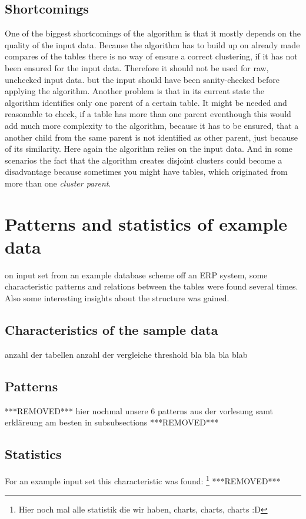 \documentclass[10pt, journal, twocolumn]{IEEEtran}
\begin{document}
\subsection{Shortcomings}
One of the biggest shortcomings of the algorithm is that it mostly depends on the quality of the input data. Because the algorithm has to build up on already made compares of the tables there is no way of ensure a correct clustering, if it has not been ensured for the input data. Therefore it should not be used for raw, unchecked input data. but the input should have been sanity-checked before applying the algorithm. Another problem is that in its current state the algorithm identifies only one parent of a certain table. It might be needed and reasonable to check, if a table has more than one parent eventhough this would add much more complexity to the algorithm, because it has to be ensured, that a another child from the same parent is not identified as other parent, just because of its similarity. Here again the algorithm relies on the input data. And in some scenarios the fact that the algorithm creates disjoint clusters could become a disadvantage because sometimes you might have tables, which originated from more than one \textit{cluster parent}.
\section{Patterns and statistics of example data}
 on input set from an example database scheme off an ERP system, some characteristic patterns and relations between the tables were found several times. Also some interesting insights about the structure was gained.
\subsection{Characteristics of the sample data}
 anzahl der tabellen anzahl der vergleiche threshold bla bla bla blab
\subsection{Patterns}
***REMOVED***
	hier nochmal unsere 6 patterns aus der vorlesung samt erkläreung am besten in subsubsections
***REMOVED***
\subsection{Statistics}
For an example input set this characteristic was found:
\footnote{Hier noch mal alle statistik die wir haben, charts, charts, charts :D }
***REMOVED***
\end{document}
